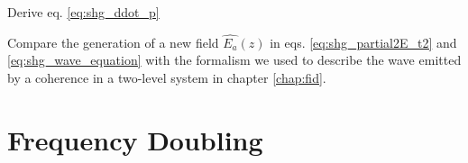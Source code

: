 \begin{questions}

\item Derive eq. \ref{eq:shg_ddot_p}

\item Compare the generation of a new field $\hat{E_a}(z)$ in eqs. \ref{eq:shg_partial2E_t2} and   \ref{eq:shg_wave_equation} with the formalism we used to describe the wave emitted by a coherence in a two-level system in chapter \ref{chap:fid}.


\end{questions}


\section{Frequency Doubling}

